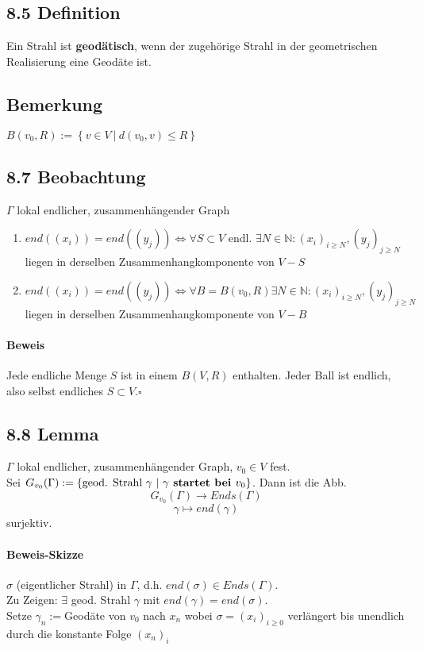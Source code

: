 \documentclass{article}
\newcommand{\df}[1]{\textbf{#1}\index{#1}}
\newcommand{\N}{\mathbb{N}}
\newcommand{\set}[2]{\left\lbrace #1~|~#2 \right\rbrace}
\newcommand{\qed}{\hfill $\square$}
\begin{document}
\subsection{8.5 Definition}
Ein Strahl ist \df{geodätisch}, wenn der zugehörige Strahl in der geometrischen Realisierung eine Geodäte ist.

\subsection{Bemerkung}
$B(v_0, R) := \set{v \in V}{d(v_0, v) \leq R}$

\subsection{8.7 Beobachtung}
$\Gamma$ lokal endlicher, zusammenhängender Graph
\begin{enumerate}
	\item $end((x_i)) = end((y_j)) \Longleftrightarrow \forall S \subset V \text{ endl. } \exists N \in \N: (x_i)_{i \geq N},(y_j)_{j \geq N}$ liegen in derselben Zusammenhangkomponente von $V-S$
	\item $end((x_i)) = end((y_j)) \Longleftrightarrow \forall B = B(v_0, R) \exists N \in \N: (x_i)_{i \geq N}, (y_j)_{j \geq N}$ liegen in derselben Zusammenhangkomponente von $V-B$
\end{enumerate}
\paragraph{Beweis}
Jede endliche Menge $S$ ist in einem $B(V,R)$ enthalten. Jeder Ball ist endlich, also selbst endliches $S \subset V$.\qed

\subsection{8.8 Lemma}
$\Gamma$ lokal endlicher, zusammenhängender Graph, $v_0 \in V$ fest.\\
Sei $G_{v_0}(\Gamma) := \set{\text{geod. Strahl } \gamma}{\gamma \df{ startet bei }v_0}$. Dann ist die Abb.
\[G_{v_0}(\Gamma ) \longrightarrow Ends(\Gamma) \]
\[\gamma \longmapsto end(\gamma) \]
surjektiv.

\paragraph{Beweis-Skizze}
$\sigma$ (eigentlicher Strahl) in $\Gamma$, d.h. $end(\sigma) \in Ends(\Gamma)$.\\
Zu Zeigen: $\exists$ geod. Strahl $\gamma$ mit $end(\gamma) = end(\sigma)$.\\
Setze $\gamma_n := $Geodäte von $v_0$ nach $x_n$ wobei $\sigma = (x_i)_{i\geq 0}$ verlängert bis unendlich durch die konstante Folge $(x_n)_i$\\
\end{document}
